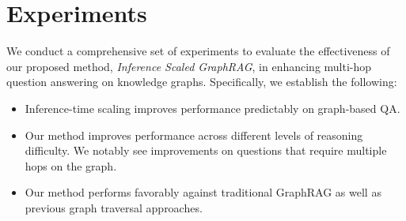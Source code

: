 \section{Experiments}
We conduct a comprehensive set of experiments to evaluate the effectiveness of our proposed method, \textit{Inference Scaled GraphRAG}, in enhancing multi-hop question answering on knowledge graphs. Specifically, we establish the following:

\begin{itemize}
    \item Inference-time scaling improves performance predictably on graph-based QA. 
    \item Our method improves performance across different levels of reasoning difficulty. We notably see improvements on questions that require multiple hops on the graph. 
    \item Our method performs favorably against traditional GraphRAG as well as previous graph traversal approaches.
\end{itemize}

